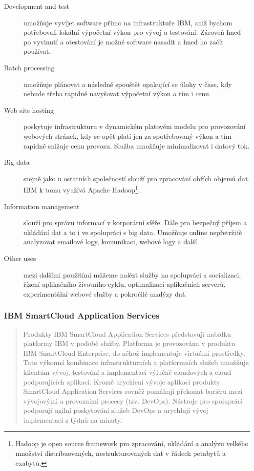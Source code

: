 \begin{description}
	\item[Development and test] umožňuje vyvíjet software přímo na infrastruktuře IBM, aniž bychom potřebovali lokální výpočetní výkon pro vývoj a testování. Zároveň hned po vyvinutí a otestování je možné software nasadit a hned ho začít používat.
	\item[Batch processing] umožňuje plánovat a následně spouštět opakující se úlohy v čase, kdy nebude třeba rapidně navyšovat výpočetní výkon a tím i cenu.
	\item[Web site hosting] poskytuje infrastrukturu v dynamickém platovém modelu pro provozování webových stránek, kdy se opět platí jen za spotřebovaný výkon a tím rapidně snižuje cenu provozu. Služba umožňuje minimalizovat i datový tok.
	\item[Big data] stejně jako u ostatních společností slouží pro zpracování obřích objemů dat. IBM k tomu využívá Apache Hadoop\footnote{Hadoop je open source framework pro zpracování, ukládání a analýzu velkého množství distribuovaných, nestrukturovaných dat v řádech petabytů a exabytů.\cite{ibm:hadoop}}.
	\item[Information management] slouží pro správu informací v korporátní sféře. Dále pro bezpečný příjem a ukládání dat a to i ve spolupráci s big data. Umožňuje online nepřetržitě analyzovat emailové logy, komunikaci, webové logy a další.
	\item[Other uses] mezi dalšími použitími můžeme nalézt služby na spolupráci a socializaci, řízení aplikačního životního cyklu, optimalizaci aplikačních serverů, experimentální webové služby a pokročilé analýzy dat.
\end{description}

\subsubsection{IBM SmartCloud Application Services}
\begin{quote}
Produkty IBM SmartCloud Application Services představují nabídku platformy IBM v podobě služby. Platforma je provozována v produktu IBM SmartCloud Enterprise, do něhož implementuje virtuální prostředky. Tato výkonná kombinace infrastrukturních a platformních služeb umožňuje klientům vývoj, testování a implementaci výlučně cloudových a cloud podporujících aplikací. Kromě urychlení vývoje aplikací produkty SmartCloud Application Services rovněž pomáhají překonat bariéru mezi vývojovými a provozními procesy (tzv. DevOps). Nástroje pro spolupráci podporují agilní poskytování služeb DevOps a urychlují vývoj implementací z týdnů na minuty.\cite{ibm:smartCloudEnt}
\end{quote}

